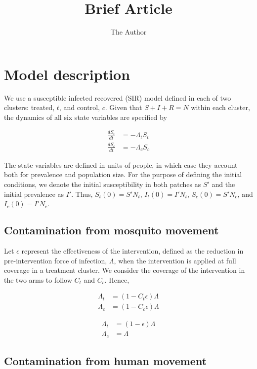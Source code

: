 \documentclass[11pt]{amsart}
\title{Brief Article}
\author{The Author}
\begin{document}
\maketitle

\section{Model description}

We use a susceptible infected recovered (SIR) model defined in each of two clusters: treated, $t$, and control, $c$. Given that $S+I+R=N$ within each cluster, the dynamics of all six state variables are specified by

\begin{align}
\frac{dS_t}{dt} &= - 
\Lambda_t S_t \\
\frac{dS_c}{dt} &= - \Lambda_c S_c
\end{align}

\noindent The state variables are defined in units of people, in which case they account both for prevalence and population size. For the purpose of defining the initial conditions, we denote the initial susceptibility in both patches as $S'$ and the initial prevalence as $I'$. Thus, $S_t(0)=S'N_t$, $I_t(0)=I'N_t$, $S_c(0)=S'N_c$, and $I_c(0)=I'N_c$.


\subsection{Contamination from mosquito movement}

Let $\epsilon$ represent the effectiveness of the intervention, defined as the reduction in pre-intervention force of infection, $\Lambda$, when the intervention is applied at full coverage in a treatment cluster. We consider the coverage of the intervention in the two arms to follow $C_t$ and $C_c$. Hence,

\begin{align}
\Lambda_t &= (1-C_t\epsilon)\Lambda \\
\Lambda_c &= (1-C_c\epsilon)\Lambda
\end{align}

\begin{align}
\Lambda_t &= (1-\epsilon)\Lambda \\
\Lambda_c &= \Lambda
\end{align}


\subsection{Contamination from human movement}
\end{document}
